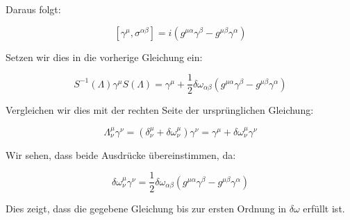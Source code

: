 Daraus folgt:

\[
[\gamma^\mu, \sigma^{\alpha\beta}] = i (g^{\mu\alpha} \gamma^\beta - g^{\mu\beta} \gamma^\alpha)
\]

Setzen wir dies in die vorherige Gleichung ein:

\[
S^{-1}(\Lambda) \gamma^\mu S(\Lambda) = \gamma^\mu + \frac{1}{2} \delta \omega_{\alpha\beta} (g^{\mu\alpha} \gamma^\beta - g^{\mu\beta} \gamma^\alpha)
\]

Vergleichen wir dies mit der rechten Seite der ursprünglichen Gleichung:

\[
\Lambda_\nu^\mu \gamma^\nu = (\delta^\mu_\nu + \delta \omega^\mu_\nu) \gamma^\nu = \gamma^\mu + \delta \omega^\mu_\nu \gamma^\nu
\]

Wir sehen, dass beide Ausdrücke übereinstimmen, da:

\[
\delta \omega^\mu_\nu \gamma^\nu = \frac{1}{2} \delta \omega_{\alpha\beta} (g^{\mu\alpha} \gamma^\beta - g^{\mu\beta} \gamma^\alpha)
\]

Dies zeigt, dass die gegebene Gleichung bis zur ersten Ordnung in $\delta \omega$ erfüllt ist.